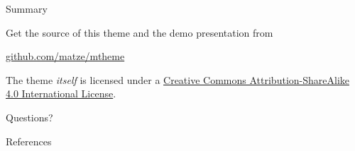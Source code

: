 \documentclass[10pt]{beamer}
\begin{document}
\begin{frame}{Summary}

  Get the source of this theme and the demo presentation from

  \begin{center}\url{github.com/matze/mtheme}\end{center}

  The theme \emph{itself} is licensed under a
  \href{http://creativecommons.org/licenses/by-sa/4.0/}{Creative Commons
  Attribution-ShareAlike 4.0 International License}.

  \begin{center}\ccbysa\end{center}

\end{frame}

\begin{frame}[standout]
  Questions?
\end{frame}

\appendix


\begin{frame}[allowframebreaks]{References}

  
  

\end{frame}
\end{document}
